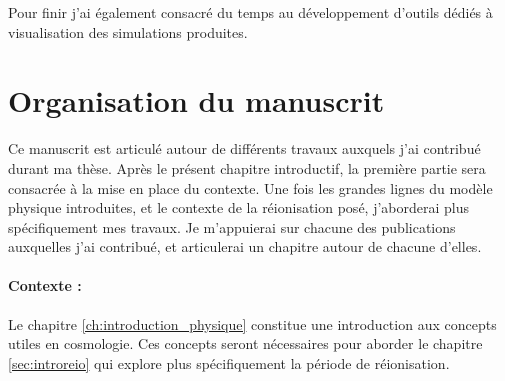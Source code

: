 
Pour finir j'ai également consacré du temps au développement d'outils dédiés à visualisation des simulations produites.

%

\section*{Organisation du manuscrit}

Ce manuscrit est articulé autour de différents travaux auxquels j'ai contribué durant ma thèse.
Après le présent chapitre introductif, la première partie sera consacrée à la mise en place du contexte.
Une fois les grandes lignes du modèle physique introduites, et le contexte de la réionisation posé, j'aborderai plus spécifiquement mes travaux.
Je m'appuierai sur chacune des publications auxquelles j'ai contribué, et articulerai un chapitre autour de chacune d'elles. 

\paragraph{Contexte :}
Le chapitre \ref{ch:introduction_physique} constitue une introduction aux concepts utiles en cosmologie.
Ces concepts seront nécessaires pour aborder le chapitre \ref{sec:introreio} qui explore plus spécifiquement la période de réionisation.

